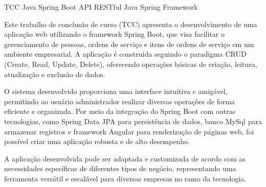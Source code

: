 \palavraschaves
{TCC Java Spring Boot}
{API RESTful}
{Java}
{Spring Framework}




Este trabalho de conclusão de curso (TCC) apresenta o desenvolvimento de uma aplicação web utilizando o framework Spring Boot, que visa facilitar o gerenciamento de pessoas, ordens de serviço e itens de ordens de serviço em um ambiente empresarial. A aplicação é construída seguindo o paradigma CRUD (Create, Read, Update, Delete), oferecendo operações básicas de criação, leitura, atualização e exclusão de dados.

O sistema desenvolvido proporciona uma interface intuitiva e amigável, permitindo ao usuário administrador realizar diversas operações de forma eficiente e organizada. Por meio da integração do Spring Boot com outras tecnologias, como Spring Data JPA para persistência de dados, banco MySql para armazenar registros e framework Angular para renderização de páginas web, foi possível criar uma aplicação robusta e de alto desempenho.

A aplicação desenvolvida pode ser adaptada e customizada de acordo com as necessidades específicas de diferentes tipos de negócio, representando uma ferramenta versátil e escalável para diversas empresas no ramo da tecnologia.\\

\imprimirchaves %


